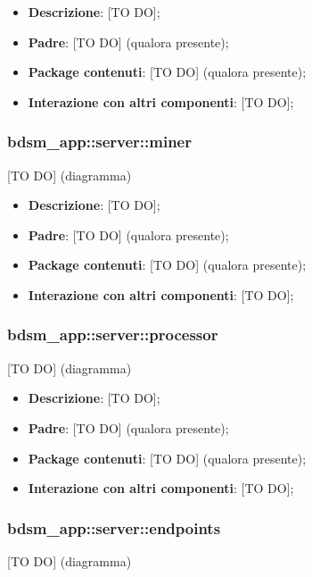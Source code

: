   \begin{itemize}
    \item \textbf{Descrizione}: [TO DO];
    \item \textbf{Padre}: [TO DO] (qualora presente);
    \item \textbf{Package contenuti}: [TO DO] (qualora presente);
    \item \textbf{Interazione con altri componenti}: [TO DO];
  \end{itemize}
  
	  \subsubsection{bdsm\_app::server::miner} %
  \label{ssub:bdsm_app_server_miner}
  [TO DO] (diagramma) \newline \newline

  \begin{itemize}
    \item \textbf{Descrizione}: [TO DO];
    \item \textbf{Padre}: [TO DO] (qualora presente);
    \item \textbf{Package contenuti}: [TO DO] (qualora presente);
    \item \textbf{Interazione con altri componenti}: [TO DO];
  \end{itemize}
  
  	  \subsubsection{bdsm\_app::server::processor} %
  \label{ssub:bdsm_app_server_processor}
  [TO DO] (diagramma) \newline \newline

  \begin{itemize}
    \item \textbf{Descrizione}: [TO DO];
    \item \textbf{Padre}: [TO DO] (qualora presente);
    \item \textbf{Package contenuti}: [TO DO] (qualora presente);
    \item \textbf{Interazione con altri componenti}: [TO DO];
  \end{itemize}

	  	  \subsubsection{bdsm\_app::server::endpoints} %
  \label{ssub:bdsm_app_server_endpoints}
  [TO DO] (diagramma) \newline \newline

